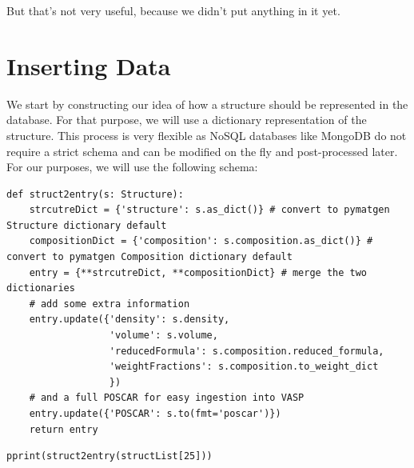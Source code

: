 But that's not very useful, because we didn't put anything in it yet.

\hypertarget{inserting-data}{%
\section{Inserting Data}\label{pysipfenntutorial:inserting-data}}

We start by constructing our idea of how a structure should be
represented in the database. For that purpose, we will use a dictionary
representation of the structure. This process is very flexible as NoSQL
databases like MongoDB do not require a strict schema and can be
modified on the fly and post-processed later. For our purposes, we will
use the following schema:

\begin{verbatim}
def struct2entry(s: Structure):
    strcutreDict = {'structure': s.as_dict()} # convert to pymatgen Structure dictionary default
    compositionDict = {'composition': s.composition.as_dict()} # convert to pymatgen Composition dictionary default
    entry = {**strcutreDict, **compositionDict} # merge the two dictionaries
    # add some extra information
    entry.update({'density': s.density,
                  'volume': s.volume,
                  'reducedFormula': s.composition.reduced_formula,
                  'weightFractions': s.composition.to_weight_dict
                  }) 
    # and a full POSCAR for easy ingestion into VASP
    entry.update({'POSCAR': s.to(fmt='poscar')})
    return entry
\end{verbatim}

\begin{verbatim}
pprint(struct2entry(structList[25]))
\end{verbatim}


